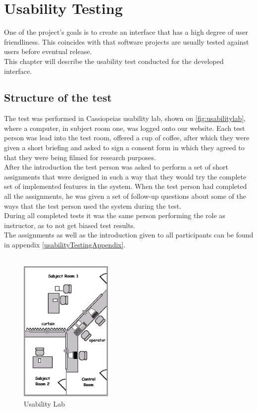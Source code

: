 \chapter{Usability Testing}
\label{chap:usabilityTesting}
One of the project's goals is to create an interface that has a high degree of user friendliness. This coincides with that software projects  are usually tested against users before eventual release.\\
This chapter will describe the usability test conducted for the developed interface.

\section{Structure of the test}
The test was performed in Cassiopeias usability lab, shown on \autoref{fig:usabilitylab},  where a computer, in subject room one, was logged onto our website.
Each test person was lead into the test room, offered a cup of coffee, after which they were given a short briefing and asked to sign a consent form in which they agreed to that they were being filmed for research purposes.\\
After the introduction the test person was asked to perform a set of short assignments that were designed in such a way that they would try the complete set of implemented features in the system. 
When the test person had completed all the assignments,  he was given a set of follow-up questions about some of the ways that the test person used the system during the test.\\
During all completed tests it was the same person performing the role as instructor, as to not get biased test results.\\
The assignments as well as the introduction given to all participants can be found in appendix \vref{usabilityTestingAppendix}.\\
\\

\begin{figure}[!h]
	\centering
		\includegraphics[width=0.40\textwidth]{images/usabilitylab.png}
	\caption{Usability Lab}
	\label{fig:usabilitylab}
\end{figure}

